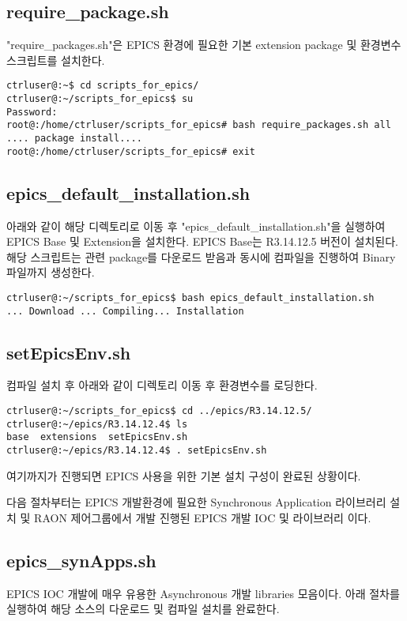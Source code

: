 \documentclass[11pt
  , a4paper
  , article
  , oneside
]{memoir}
\begin{document}
\subsection{require\_package.sh}
"require\_packages.sh"은 EPICS 환경에 필요한 기본 extension package 및 환경변수 스크립트를 설치한다.
\begin{lstlisting}[style=termstyle]
ctrluser@:~$ cd scripts_for_epics/
ctrluser@:~/scripts_for_epics$ su
Password: 
root@:/home/ctrluser/scripts_for_epics# bash require_packages.sh all
.... package install....
root@:/home/ctrluser/scripts_for_epics# exit
\end{lstlisting}

\subsection{epics\_default\_installation.sh}
아래와 같이 해당 디렉토리로 이동 후 "epics\_default\_installation.sh"을 실행하여 EPICS Base 및 Extension을 설치한다. EPICS Base는 R3.14.12.5 버전이 설치된다. 해당 스크립트는 관련 package를 다운로드 받음과 동시에 컴파일을 진행하여 Binary 파일까지 생성한다.
\begin{lstlisting}[style=termstyle]
ctrluser@:~/scripts_for_epics$ bash epics_default_installation.sh 
... Download ... Compiling... Installation
\end{lstlisting}

\subsection{setEpicsEnv.sh}
컴파일 설치 후 아래와 같이 디렉토리 이동 후 환경변수를 로딩한다.
\begin{lstlisting}[style=termstyle]
ctrluser@:~/scripts_for_epics$ cd ../epics/R3.14.12.5/
ctrluser@:~/epics/R3.14.12.4$ ls
base  extensions  setEpicsEnv.sh
ctrluser@:~/epics/R3.14.12.4$ . setEpicsEnv.sh 
\end{lstlisting}
여기까지가 진행되면 EPICS 사용을 위한 기본 설치 구성이 완료된 상황이다.

\hfil\break
다음 절차부터는 EPICS 개발환경에 필요한 Synchronous Application 라이브러리 설치 및 RAON 제어그룹에서 개발 진행된 EPICS 개발 IOC 및 라이브러리 이다.

\subsection{epics\_synApps.sh}
EPICS IOC 개발에 매우 유용한 Asynchronous 개발 libraries 모음이다. 아래 절차를 실행하여 해당 소스의 다운로드 및 컴파일 설치를 완료한다.
\end{document}
